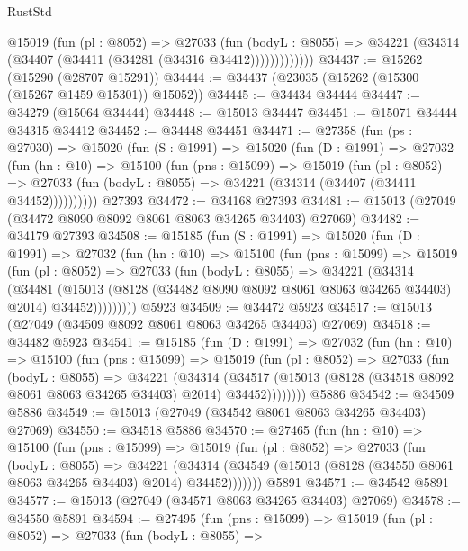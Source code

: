 \begin{lexlean}{RustStd}
\begin{coremodule}
              @15019
                (fun (pl : @8052) =>
                @27033
                  (fun (bodyL : @8055) =>
                  @34221 (@34314 (@34407 (@34411 (@34281 (@34316 @34412)))))))))))))
@34437 := @15262 (@15290 (@28707 @15291))
@34444 := @34437 (@23035 (@15262 (@15300 (@15267 @1459 @15301)) @15052))
@34445 := @34434 @34444
@34447 := @34279 (@15064 @34444)
@34448 := @15013 @34447
@34451 := @15071 @34444 @34315 @34412
@34452 := @34448 @34451
@34471 := @27358
    (fun (ps : @27030) =>
    @15020
      (fun (S : @1991) =>
      @15020
        (fun (D : @1991) =>
        @27032
          (fun (hn : @10) =>
          @15100
            (fun (pns : @15099) =>
            @15019
              (fun (pl : @8052) =>
              @27033 (fun (bodyL : @8055) => @34221 (@34314 (@34407 (@34411 @34452))))))))))
    @27393
@34472 := @34168 @27393
@34481 := @15013 (@27049 (@34472 @8090 @8092 @8061 @8063 @34265 @34403) @27069)
@34482 := @34179 @27393
@34508 := @15185
    (fun (S : @1991) =>
    @15020
      (fun (D : @1991) =>
      @27032
        (fun (hn : @10) =>
        @15100
          (fun (pns : @15099) =>
          @15019
            (fun (pl : @8052) =>
            @27033
              (fun (bodyL : @8055) =>
              @34221
                (@34314
                  (@34481
                    (@15013
                      (@8128 (@34482 @8090 @8092 @8061 @8063 @34265 @34403) @2014)
                      @34452)))))))))
    @5923
@34509 := @34472 @5923
@34517 := @15013 (@27049 (@34509 @8092 @8061 @8063 @34265 @34403) @27069)
@34518 := @34482 @5923
@34541 := @15185
    (fun (D : @1991) =>
    @27032
      (fun (hn : @10) =>
      @15100
        (fun (pns : @15099) =>
        @15019
          (fun (pl : @8052) =>
          @27033
            (fun (bodyL : @8055) =>
            @34221
              (@34314
                (@34517
                  (@15013 (@8128 (@34518 @8092 @8061 @8063 @34265 @34403) @2014) @34452))))))))
    @5886
@34542 := @34509 @5886
@34549 := @15013 (@27049 (@34542 @8061 @8063 @34265 @34403) @27069)
@34550 := @34518 @5886
@34570 := @27465
    (fun (hn : @10) =>
    @15100
      (fun (pns : @15099) =>
      @15019
        (fun (pl : @8052) =>
        @27033
          (fun (bodyL : @8055) =>
          @34221
            (@34314 (@34549 (@15013 (@8128 (@34550 @8061 @8063 @34265 @34403) @2014) @34452)))))))
    @5891
@34571 := @34542 @5891
@34577 := @15013 (@27049 (@34571 @8063 @34265 @34403) @27069)
@34578 := @34550 @5891
@34594 := @27495
    (fun (pns : @15099) =>
    @15019
      (fun (pl : @8052) =>
      @27033
        (fun (bodyL : @8055) =>

\end{coremodule}
\end{lexlean}

